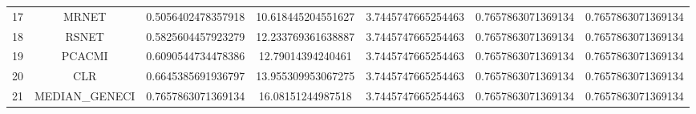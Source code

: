 \documentclass[a4paper,10pt]{article}
\begin{document}
\begin{landscape}
\begin{table}[!htp]
\begin{tabular}{ccccccc}
17&MRNET&0.5056402478357918&10.618445204551627&3.7445747665254463&0.7657863071369134&0.7657863071369134\\
18&RSNET&0.5825604457923279&12.233769361638887&3.7445747665254463&0.7657863071369134&0.7657863071369134\\
19&PCACMI&0.6090544734478386&12.79014394240461&3.7445747665254463&0.7657863071369134&0.7657863071369134\\
20&CLR&0.6645385691936797&13.955309953067275&3.7445747665254463&0.7657863071369134&0.7657863071369134\\
21&MEDIAN_GENECI&0.7657863071369134&16.08151244987518&3.7445747665254463&0.7657863071369134&0.7657863071369134\\
\hline
\end{tabular}
\end{table}


\end{landscape}
\end{document}
